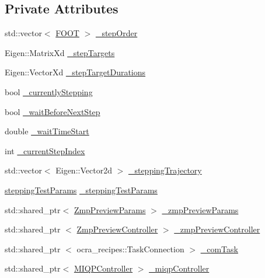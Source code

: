 \subsection*{\-Private \-Attributes}
\begin{DoxyCompactItemize}
\item 
std\-::vector$<$ \hyperlink{utils_8h_a4b6a8e135f90bd56e5a57a60efb42529}{\-F\-O\-O\-T} $>$ \hyperlink{classWalkingClient_acc23c96509280a29e7331cc1b0fe0576}{\-\_\-step\-Order}
\item 
\-Eigen\-::\-Matrix\-Xd \hyperlink{classWalkingClient_a7bce7b80a798dd4d46dfc93947ea4d31}{\-\_\-step\-Targets}
\item 
\-Eigen\-::\-Vector\-Xd \hyperlink{classWalkingClient_abddb902c1db56468913945eb8b81c55e}{\-\_\-step\-Target\-Durations}
\item 
bool \hyperlink{classWalkingClient_aeaed1c4beda89ebe62ba7e3e6c0902dd}{\-\_\-currently\-Stepping}
\item 
bool \hyperlink{classWalkingClient_a0006acb41bc17941086f841e7edeb5b3}{\-\_\-wait\-Before\-Next\-Step}
\item 
double \hyperlink{classWalkingClient_a2814e5c3372855c087226778925bafe1}{\-\_\-wait\-Time\-Start}
\item 
int \hyperlink{classWalkingClient_a7d122ec14817ae7ea6bc5b2aba404950}{\-\_\-current\-Step\-Index}
\item 
std\-::vector$<$ \-Eigen\-::\-Vector2d $>$ \hyperlink{classWalkingClient_a4f76ca724ed725f6f727828e30fcf628}{\-\_\-stepping\-Trajectory}
\item 
\hyperlink{structsteppingTestParams}{stepping\-Test\-Params} \hyperlink{classWalkingClient_ae806c00e966e6d121426288a017aaa7d}{\-\_\-stepping\-Test\-Params}
\item 
std\-::shared\-\_\-ptr$<$ \hyperlink{structZmpPreviewParams}{\-Zmp\-Preview\-Params} $>$ \hyperlink{classWalkingClient_a9a2cf2d6107ab91fc5bd1d82a3b85a84}{\-\_\-zmp\-Preview\-Params}
\item 
std\-::shared\-\_\-ptr\*
$<$ \hyperlink{classZmpPreviewController}{\-Zmp\-Preview\-Controller} $>$ \hyperlink{classWalkingClient_ae570aa07bed9e336eda93f331f3485fb}{\-\_\-zmp\-Preview\-Controller}
\item 
std\-::shared\-\_\-ptr\*
$<$ ocra\-\_\-recipes\-::\-Task\-Connection $>$ \hyperlink{classWalkingClient_aa798d6193535e80816f8107ee5fb2172}{\-\_\-com\-Task}
\item 
std\-::shared\-\_\-ptr$<$ \hyperlink{classMIQPController}{\-M\-I\-Q\-P\-Controller} $>$ \hyperlink{classWalkingClient_a5dd1abe90bf7182766548c93673af2df}{\-\_\-miqp\-Controller}

\end{DoxyCompactItemize}
